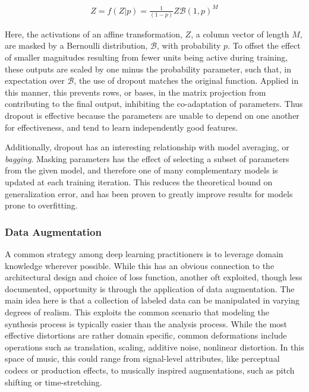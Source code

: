 \begin{align*}
Z = f(Z | p) = \frac{1}{(1 - p)} Z \mathcal{B}(1, p)^M
\end{align*}

\noindent Here, the activations of an affine transformation, $Z$, a column vector of length $M$, are masked by a Bernoulli distribution, $\mathcal{B}$, with probability $p$.
To offset the effect of smaller magnitudes resulting from fewer units being active during training, these outputs are scaled by one minus the probability parameter, such that, in expectation over $\mathcal{B}$, the use of dropout matches the original function.
Applied in this manner, this prevents rows, or bases, in the matrix projection from contributing to the final output, inhibiting the co-adaptation of parameters.
Thus dropout is effective because the parameters are unable to depend on one another for effectiveness, and tend to learn independently good features.

Additionally, dropout has an interesting relationship with model averaging, or \emph{bagging}.
Masking parameters has the effect of selecting a subset of parameters from the given model, and therefore one of many complementary models is updated at each training iteration.
This reduces the theoretical bound on generalization error, and has been proven to greatly improve results for models prone to overfitting.


\subsubsection{Data Augmentation}

A common strategy among deep learning practitioners is to leverage domain knowledge wherever possible.
While this has an obvious connection to the architectural design and choice of loss function, another oft exploited, though less documented, opportunity is through the application of data augmentation.
The main idea here is that a collection of labeled data can be manipulated in varying degrees of realism.
This exploits the common scenario that modeling the synthesis process is typically easier than the analysis process.
While the most effective distortions are rather domain specific, common deformations include operations such as translation, scaling, additive noise, nonlinear distortion.
In this space of music, this could range from signal-level attributes, like perceptual codecs or production effects, to musically inspired augmentations, such as pitch shifting or time-stretching.


